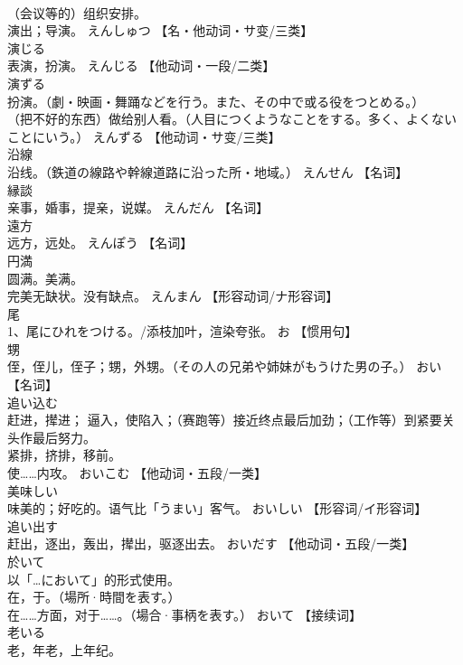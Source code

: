 \documentclass[8pt]{extreport}
\begin{document}
\begin{CJK}{UTF8}{min}
\\	（会议等的）组织安排。 
\\	演出；导演。	えんしゅつ		【名・他动词・サ变/三类】
\\	演じる	
\\	表演，扮演。	えんじる		【他动词・一段/二类】
\\	演ずる	
\\	扮演。（劇・映画・舞踊などを行う。また、その中で或る役をつとめる。） 
\\	（把不好的东西）做给别人看。（人目につくようなことをする。多く、よくないことにいう。）	えんずる		【他动词・サ变/三类】
\\	沿線	
\\	沿线。（鉄道の線路や幹線道路に沿った所・地域。）	えんせん		【名词】
\\	縁談	
\\	亲事，婚事，提亲，说媒。	えんだん		【名词】
\\	遠方	
\\	远方，远处。	えんぽう		【名词】
\\	円満	
\\	圆满。美满。 
\\	完美无缺状。没有缺点。	えんまん		【形容动词/ナ形容词】
\\	尾	
\\	1、尾にひれをつける。/添枝加叶，渲染夸张。	お		【惯用句】
\\	甥	
\\	侄，侄儿，侄子；甥，外甥。（その人の兄弟や姉妹がもうけた男の子。）	おい		【名词】
\\	追い込む	
\\	赶进，撵进； 逼入，使陷入；（赛跑等）接近终点最后加劲；（工作等）到紧要关头作最后努力。 
\\	紧排，挤排，移前。 
\\	使……内攻。	おいこむ		【他动词・五段/一类】
\\	美味しい	
\\	味美的；好吃的。语气比「うまい」客气。	おいしい		【形容词/イ形容词】
\\	追い出す	
\\	赶出，逐出，轰出，撵出，驱逐出去。	おいだす		【他动词・五段/一类】
\\	於いて	
\\	以「…において」的形式使用。 
\\	在，于。（場所·時間を表す。） 
\\	在……方面，对于……。（場合·事柄を表す。）	おいて		【接续词】
\\	老いる	
\\	老，年老，上年纪。 

\end{CJK}
\end{document}
